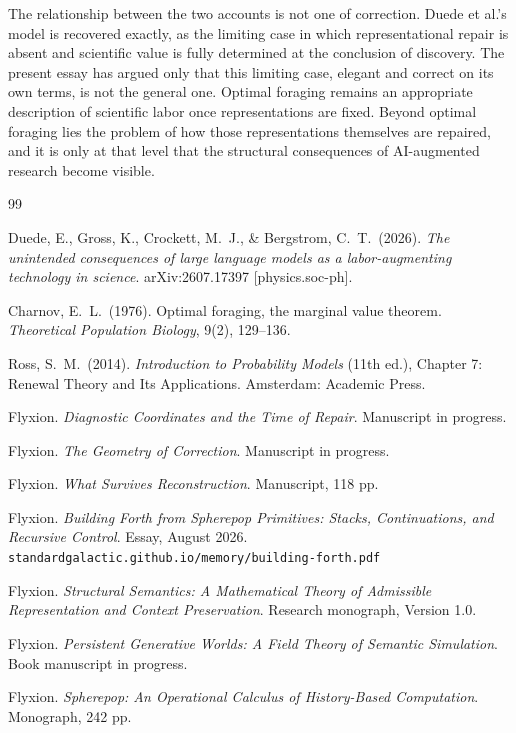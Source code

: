 \documentclass[11pt]{article}
\begin{document}
The relationship between the two accounts is not one of correction. Duede et al.'s model is recovered exactly, as the limiting case in which representational repair is absent and scientific value is fully determined at the conclusion of discovery. The present essay has argued only that this limiting case, elegant and correct on its own terms, is not the general one. Optimal foraging remains an appropriate description of scientific labor once representations are fixed. Beyond optimal foraging lies the problem of how those representations themselves are repaired, and it is only at that level that the structural consequences of AI-augmented research become visible.

\begin{thebibliography}{99}

Duede, E., Gross, K., Crockett, M.\ J., \& Bergstrom, C.\ T.\ (2026). \textit{The unintended consequences of large language models as a labor-augmenting technology in science}. arXiv:2607.17397 [physics.soc-ph].

Charnov, E.\ L.\ (1976). Optimal foraging, the marginal value theorem. \textit{Theoretical Population Biology}, 9(2), 129--136.

Ross, S.\ M.\ (2014). \textit{Introduction to Probability Models} (11th ed.), Chapter 7: Renewal Theory and Its Applications. Amsterdam: Academic Press.

Flyxion. \textit{Diagnostic Coordinates and the Time of Repair}. Manuscript in progress.

Flyxion. \textit{The Geometry of Correction}. Manuscript in progress.

Flyxion. \textit{What Survives Reconstruction}. Manuscript, 118 pp.

Flyxion. \textit{Building Forth from Spherepop Primitives: Stacks, Continuations, and Recursive Control}. Essay, August 2026. \texttt{standardgalactic.github.io/memory/building-forth.pdf}

Flyxion. \textit{Structural Semantics: A Mathematical Theory of Admissible Representation and Context Preservation}. Research monograph, Version 1.0.

Flyxion. \textit{Persistent Generative Worlds: A Field Theory of Semantic Simulation}. Book manuscript in progress.

Flyxion. \textit{Spherepop: An Operational Calculus of History-Based Computation}. Monograph, 242 pp.

\end{thebibliography}
\end{document}
